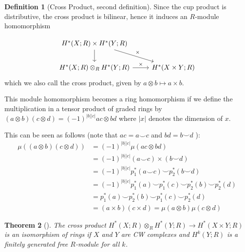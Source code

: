 \documentclass[reqno]{amsart}
\newtheorem{theorem}{Theorem}[section]
\theoremstyle{definition}
\newtheorem{definition}[theorem]{Definition}
\theoremstyle{remark}
\begin{document}
    \begin{definition}[Cross Product, second definition]
    Since the cup product is distributive, the cross
    product is bilinear, hence it induces an
    $R$-module homomorphism

    \begin{equation*}
    \begin{tikzcd}
        H^{*}(X;R) \times H^{*}(Y;R) \ar[dr, "\times "]
        \ar[d] &\\
        H^{*}(X;R) \otimes_R H^{*}(Y;R) 
        \ar[r, "\times "] & H^{*}(X \times Y;R)
    \end{tikzcd}
    \end{equation*}
    which we also call the cross product, given
    by $a \otimes b \mapsto a \times b$.
    \end{definition}

    This module homomorphism becomes
    a ring homomorphism if we define
    the multiplication in a tensor product
    of graded rings by
    $\left( a \otimes b \right) \left( c \otimes d \right) 
    = (-1)^{\left| b \right| \left| c \right| }
    ac \otimes bd$ where
    $\left| x \right| $ denotes the dimension of $x$.
    
    This can be seen as follows (note that
    $ac = a \smile c$ and $bd = b \smile d$ ):
    \begin{align*}
        \mu \left( \left( a \otimes b \right) 
        \left( c \otimes d \right) \right) 
        &= (-1)^{\left| b \right| \left| c \right| }
        \mu \left( ac \otimes bd \right) \\
        &= (-1)^{\left| b \right| \left| c \right| }
        (a \smile c) \times (b \smile d)\\
        &= (-1)^{\left| b \right| \left| c \right| }
        p_1^{*} (a \smile c) \smile
        p_2^{*}\left( b \smile d \right) \\
        &= (-1)^{\left| b \right| \left| c \right| }
        p_1^{*}(a) \smile p_1^{*}(c) \smile
        p_2^{*}(b) \smile p_2^{*}(d)\\
        &= p_1^{*}(a) \smile p_2^{*}(b) \smile
        p_1^{*}(c) \smile p_2^{*}(d)\\
        &= \left( a \times b \right) \left( c
        \times d\right) = \mu (a \otimes b) 
        \mu (c \otimes d)
    \end{align*}



    \begin{theorem}[]
        The cross product $H^{*}(X;R) \otimes_R
        H^{*}(Y;R) \to H^{*}(X \times Y; R)$ is an
        isomorphism of rings
        if $X$ and $Y$ are CW complexes and
        $H^{k}(Y;R)$ is a finitely generated
        free $R$-module for all $k$.
    \end{theorem}
    
\end{document}

